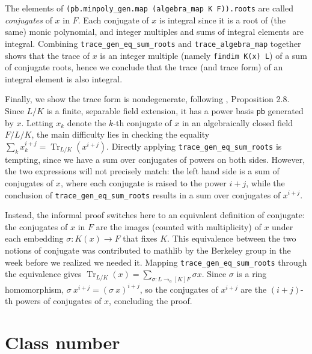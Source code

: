 \documentclass[a4paper,USenglish,cleveref, autoref, thm-restate]{lipics-v2021}
\newcommand{\lean}[1]{\texttt{#1}\xspace} %
\DeclareMathOperator{\Tr}{Tr}
\newcommand{\mathlib}{\textsf{mathlib}\xspace}
\begin{document}
The elements of \lean{(pb.minpoly\_gen.map (algebra\_map K F)).roots} are called \emph{conjugates} of $x$ in $F$.
Each conjugate of $x$ is integral since it is a root of (the same) monic polynomial,
and integer multiples and sums of integral elements are integral.
Combining \lean{trace\_gen\_eq\_sum\_roots} and \lean{trace\_algebra\_map} together shows that the trace of $x$ is an integer multiple (namely \lean{findim K(x) L}) of a sum of conjugate roots, hence we conclude that the trace (and trace form) of an integral element is also integral.

Finally, we show the trace form is nondegenerate, following \cite{Neukirch}, Proposition 2.8.
Since $L / K$ is a finite, separable field extension, it has a power basis \lean{pb} generated by $x$.
Letting $x_k$ denote the $k$-th conjugate of $x$ in an algebraically closed field $F / L / K$,
the main difficulty lies in checking the equality $\sum_k x_k^{i + j} = \Tr_{L / K} (x^{i + j})$.
Directly applying \lean{trace\_gen\_eq\_sum\_roots} is tempting, since we have a sum over conjugates of powers on both sides.
However, the two expressions will not precisely match: the left hand side is a sum of conjugates of $x$, where each conjugate is raised to the power $i + j$,
while the conclusion of \lean{trace\_gen\_eq\_sum\_roots} results in a sum over conjugates of $x^{i + j}$.

Instead, the informal proof switches here to an equivalent definition of conjugate:
the conjugates of $x$ in $F$ are the images (counted with multiplicity) of $x$ under each embedding $\sigma \colon K(x) \to F$ that fixes $K$.
This equivalence between the two notions of conjugate was contributed to \mathlib by the Berkeley group in the week before we realized we needed it.
Mapping \lean{trace\_gen\_eq\_sum\_roots} through the equivalence gives
$\Tr_{L / K}(x) = \sum_{σ : L \to_a[K] F} \sigma x$.
Since $\sigma$ is a ring homomorphism, $\sigma\ x^{i + j} = (\sigma\ x)^{i + j}$,
so the conjugates of $x^{i + j}$ are the $(i + j)$-th powers of conjugates of $x$, concluding the proof.

\section{Class number} \label{sec:class-number}
\end{document}
